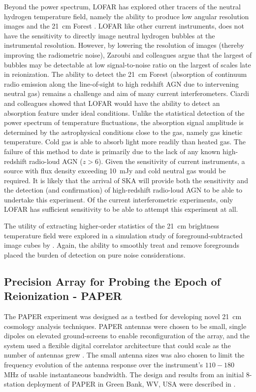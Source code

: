 Beyond the power spectrum, LOFAR has explored other tracers of the neutral hydrogen temperature field, namely the ability to produce low angular resolution images \cite{2012MNRAS.425.2964Z} and the 21~cm Forest \cite{2013MNRAS.428.1755C}. LOFAR like other current instruments, does not have the sensitivity to directly image neutral hydrogen bubbles at the instrumental resolution. However, by lowering the resolution of images (thereby improving the radiometric noise), Zaroubi and colleagues argue that the largest of bubbles may be detectable at low signal-to-noise ratio on the largest of scales late in reionization. The ability to detect the 21~cm Forest (absorption of continuum radio emission along the line-of-sight to high redshift AGN due to intervening neutral gas) remains a challenge and aim of many current interferometers. Ciardi and colleagues showed that LOFAR would have the ability to detect an absorption feature under ideal conditions. Unlike the statistical detection of the power spectrum of temperature fluctuations, the absorption signal amplitude is determined by the astrophysical conditions close to the gas, namely gas kinetic temperature. Cold gas is able to absorb light more readily than heated gas. The failure of this method to date is primarily due to the lack of any known high-redshift radio-loud AGN ($z>6$). Given the sensitivity of current instruments, a source with flux density exceeding 10~mJy and cold neutral gas would be required. It is likely that the arrival of SKA will provide both the sensitivity and the detection (and confirmation) of high-redshift radio-loud AGN to be able to undertake this experiment. Of the current interferometric experiments, only LOFAR has sufficient sensitivity to be able to attempt this experiment at all.

The utility of extracting higher-order statistics of the 21~cm brightness temperature field were explored in a simulation study of foreground-subtracted image cubes by \cite{2009MNRAS.393.1449H}. Again, the ability to smoothly treat and remove foregrounds placed the burden of detection on pure noise considerations.

\subsection{Precision Array for Probing the Epoch of Reionization - PAPER}
The PAPER experiment was designed as a testbed for developing novel 21~cm cosmology analysis techniques.  PAPER antennas were chosen to be small, single dipoles on elevated ground-screens to enable reconfiguration of the array, and the system used a flexible digital correlator architecture that could scale as the number of antennas grew \cite{parsons08}.  The small antenna sizes was also chosen to limit the frequency evolution of the antenna response over the instrument's $110-180$\, MHz of usable instantaneous bandwidth.  The design and results from an initial 8-station deployment of PAPER in Green Bank, WV, USA were described in \cite{parsons10}.

